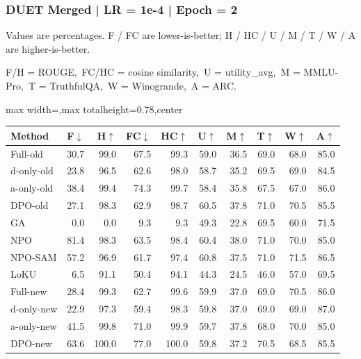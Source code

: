 \documentclass[aspectratio=169,11pt]{beamer}
\begin{document}
\begin{frame}[t]
\frametitle{DUET Merged | LR = 1e-4 | Epoch = 2}
{\tiny Values are percentages. F / FC are lower-is-better; H / HC / U / M / T / W / A are higher-is-better.}

{\tiny F/H = ROUGE,\ FC/HC = cosine similarity,\ U = utility\_avg,\ M = MMLU-Pro,\ T = TruthfulQA,\ W = Winogrande,\ A = ARC.}

\vspace{0.35em}
\centering
\scriptsize
\setlength{\tabcolsep}{3.6pt}
\renewcommand{\arraystretch}{1.05}
\begin{adjustbox}{max width=\textwidth,max totalheight=0.78\textheight,center}
\begin{tabular}{l*{9}{r}}
\toprule
Method & F$\downarrow$ & H$\uparrow$ & FC$\downarrow$ & HC$\uparrow$ & U$\uparrow$ & M$\uparrow$ & T$\uparrow$ & W$\uparrow$ & A$\uparrow$ \\
\midrule
\rowcolor{blue!10}
Full-old & 30.7 & 99.0 & 67.5 & 99.3 & 59.0 & 36.5 & 69.0 & 68.0 & 85.0 \\
\rowcolor{orange!10}
d-only-old & 23.8 & 96.5 & 62.6 & 98.0 & 58.7 & 35.2 & 69.5 & 69.0 & 84.5 \\
\rowcolor{green!10}
a-only-old & 38.4 & 99.4 & 74.3 & 99.7 & 58.4 & 35.8 & 67.5 & 67.0 & 86.0 \\
\rowcolor{gray!8}
DPO-old & 27.1 & 98.3 & 62.9 & 98.7 & 60.5 & 37.8 & 71.0 & 70.5 & 85.5 \\
\rowcolor{gray!8}
GA & 0.0 & 0.0 & 9.3 & 9.3 & 49.3 & 22.8 & 69.5 & 60.0 & 71.5 \\
\rowcolor{gray!8}
NPO & 81.4 & 98.3 & 63.5 & 98.4 & 60.4 & 38.0 & 71.0 & 70.0 & 85.0 \\
\rowcolor{gray!8}
NPO-SAM & 57.2 & 96.9 & 61.7 & 97.4 & 60.8 & 37.5 & 71.0 & 71.5 & 86.5 \\
\rowcolor{gray!8}
LoKU & 6.5 & 91.1 & 50.4 & 94.1 & 44.3 & 24.5 & 46.0 & 57.0 & 69.5 \\
\rowcolor{blue!20}
Full-new & 28.4 & 99.3 & 62.7 & 99.6 & 59.9 & 37.0 & 69.0 & 70.5 & 86.0 \\
\rowcolor{orange!20}
d-only-new & 22.9 & 97.3 & 59.4 & 98.3 & 59.8 & 37.0 & 69.0 & 69.0 & 87.0 \\
\rowcolor{green!20}
a-only-new & 41.5 & 99.8 & 71.0 & 99.9 & 59.7 & 37.8 & 68.0 & 70.0 & 85.0 \\
\rowcolor{gray!15}
DPO-new & 63.6 & 100.0 & 77.0 & 100.0 & 59.8 & 37.2 & 70.5 & 68.5 & 85.5 \\
\bottomrule
\end{tabular}
\end{adjustbox}
\end{frame}
\end{document}

